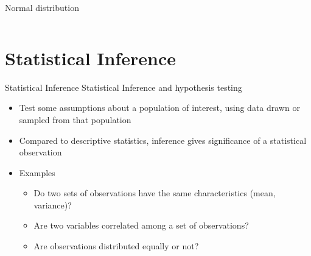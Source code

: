 \documentclass[aspectratio=169]{beamer}\usepackage[]{graphicx}\usepackage[]{color}
\newenvironment{knitrout}{}{} %
\begin{document}
\begin{frame}[fragile]{Normal distribution}
\begin{columns}
\begin{column}{0.5\textwidth}
\begin{knitrout}
\end{knitrout}
  \end{column}
\end{columns}
\end{frame}

\section{Statistical Inference}
\begin{frame}{Statistical Inference}
Statistical Inference and hypothesis testing
\begin{itemize}
  \item Test some assumptions about a population of interest, using data drawn or sampled from that population
  \item Compared to descriptive statistics, inference gives significance of a statistical observation
  \item Examples
  \begin{itemize}
    \item Do two sets of observations have the same characteristics (mean, variance)?
    \item Are two variables correlated among a set of observations?
    \item Are observations distributed equally or not?
  \end{itemize}
\end{itemize}
\end{frame}
\end{document}
